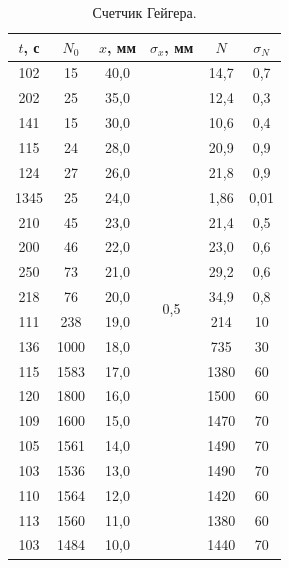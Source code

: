 \documentclass[a4paper,12pt]{article} %
\begin{document}
		\begin{table}[H]
			\caption{Счетчик Гейгера.}
			\label{table:exp1}
			\begin{tabular}{|c|c|c|c|c|c|}
				\hline
				$t$, с & $N_0$ & $x$, мм & $\sigma_x$, мм        & $N$  & $\sigma_N$ \\ \hline
				102    & 15    & 40,0    & \multirow{20}{*}{0,5} & 14,7 & 0,7        \\ \cline{1-3} \cline{5-6} 
				202    & 25    & 35,0    &                       & 12,4 & 0,3        \\ \cline{1-3} \cline{5-6} 
				141    & 15    & 30,0    &                       & 10,6 & 0,4        \\ \cline{1-3} \cline{5-6} 
				115    & 24    & 28,0    &                       & 20,9 & 0,9        \\ \cline{1-3} \cline{5-6} 
				124    & 27    & 26,0    &                       & 21,8 & 0,9        \\ \cline{1-3} \cline{5-6} 
				1345   & 25    & 24,0    &                       & 1,86 & 0,01       \\ \cline{1-3} \cline{5-6} 
				210    & 45    & 23,0    &                       & 21,4 & 0,5        \\ \cline{1-3} \cline{5-6} 
				200    & 46    & 22,0    &                       & 23,0 & 0,6        \\ \cline{1-3} \cline{5-6} 
				250    & 73    & 21,0    &                       & 29,2 & 0,6        \\ \cline{1-3} \cline{5-6} 
				218    & 76    & 20,0    &                       & 34,9 & 0,8        \\ \cline{1-3} \cline{5-6} 
				111    & 238   & 19,0    &                       & 214  & 10         \\ \cline{1-3} \cline{5-6} 
				136    & 1000  & 18,0    &                       & 735  & 30         \\ \cline{1-3} \cline{5-6} 
				115    & 1583  & 17,0    &                       & 1380 & 60         \\ \cline{1-3} \cline{5-6} 
				120    & 1800  & 16,0    &                       & 1500 & 60         \\ \cline{1-3} \cline{5-6} 
				109    & 1600  & 15,0    &                       & 1470 & 70         \\ \cline{1-3} \cline{5-6} 
				105    & 1561  & 14,0    &                       & 1490 & 70         \\ \cline{1-3} \cline{5-6} 
				103    & 1536  & 13,0    &                       & 1490 & 70         \\ \cline{1-3} \cline{5-6} 
				110    & 1564  & 12,0    &                       & 1420 & 60         \\ \cline{1-3} \cline{5-6} 
				113    & 1560  & 11,0    &                       & 1380 & 60         \\ \cline{1-3} \cline{5-6} 
				103    & 1484  & 10,0    &                       & 1440 & 70         \\ \hline
			\end{tabular}
		\end{table}
		
\end{document}

